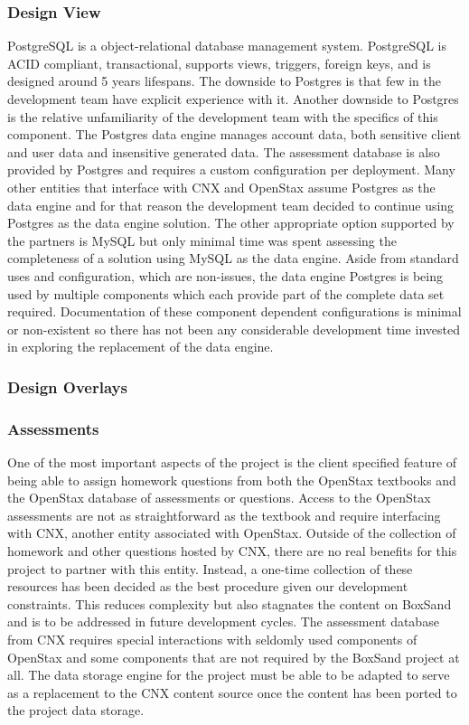 \documentclass[onecolumn, draftclsnofoot,10pt, compsoc]{IEEEtran}
\begin{document}
\subsubsection{Design View}
PostgreSQL is a object-relational database management system. PostgreSQL is ACID compliant, transactional, supports views, triggers, foreign keys, and is designed around 5 years lifespans. The downside to Postgres is that few in the development team have explicit experience with it. Another downside to Postgres is the relative unfamiliarity of the development team with the specifics of this component. The Postgres data engine manages account data, both sensitive client and user data and insensitive generated data. The assessment database is also provided by Postgres and requires a custom configuration per deployment. Many other entities that interface with CNX and OpenStax assume Postgres as the data engine and for that reason the development team decided to continue using Postgres as the data engine solution. The other appropriate option supported by the partners is MySQL but only minimal time was spent assessing the completeness of a solution using MySQL as the data engine.  Aside from standard uses and configuration, which are non-issues, the data engine Postgres is being used by multiple components which each provide part of the complete data set required. Documentation of these component dependent configurations is minimal or non-existent so there has not been any considerable development time invested in exploring the replacement of the data engine. 
\subsubsection{Design Overlays}
\subsubsection*{Assessments}
One of the most important aspects of the project is the client specified feature of being able to assign homework questions from both the OpenStax textbooks and the OpenStax database of assessments or questions. Access to the OpenStax assessments are not as straightforward as the textbook and require interfacing with CNX, another entity associated with OpenStax. Outside of the collection of homework and other questions hosted by CNX, there are no real benefits for this project to partner with this entity. Instead, a one-time collection of these resources has been decided as the best procedure given our development constraints. This reduces complexity but also stagnates the content on BoxSand and is to be addressed in future development cycles. The assessment database from CNX requires special interactions with seldomly used components of OpenStax and some components that are not required by the BoxSand project at all. The data storage engine for the project must be able to be adapted to serve as a replacement to the CNX content source once the content has been ported to the project data storage.
\end{document}
